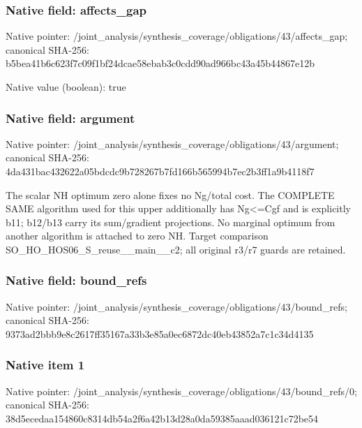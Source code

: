 \documentclass[10pt,a4paper]{article}
\begin{document}
\subsubsection{Native field: affects\_\allowbreak{}gap}
Native pointer: /joint\_\allowbreak{}analysis/synthesis\_\allowbreak{}coverage/obligations/43/affects\_\allowbreak{}gap; canonical SHA-256: b5bea41b6c623f7c09f1bf24dcae58ebab3c0cdd90ad966bc43a45b44867e12b

Native value (boolean): true

\subsubsection{Native field: argument}
Native pointer: /joint\_\allowbreak{}analysis/synthesis\_\allowbreak{}coverage/obligations/43/argument; canonical SHA-256: 4da431bac432622a05bdcdc9b728267b7fd166b565994b7ec2b3ff1a9b4118f7

\begingroup\raggedright\sloppy The scalar NH optimum zero alone fixes no Ng/\allowbreak{}total cost. The COMPLETE SAME algorithm used for this upper additionally has Ng<=\allowbreak{}Cgf and is explicitly b11;\allowbreak{} b12/\allowbreak{}b13 carry its sum/\allowbreak{}gradient projections. No marginal optimum from another algorithm is attached to zero NH. Target comparison SO\_\allowbreak{}HO\_\allowbreak{}HOS06\_\allowbreak{}S\_\allowbreak{}reuse\_\allowbreak{}\_\allowbreak{}main\_\allowbreak{}\_\allowbreak{}c2;\allowbreak{} all original r3/\allowbreak{}r7 guards are retained.\par\endgroup

\subsubsection{Native field: bound\_\allowbreak{}refs}
Native pointer: /joint\_\allowbreak{}analysis/synthesis\_\allowbreak{}coverage/obligations/43/bound\_\allowbreak{}refs; canonical SHA-256: 9373ad2bbb9e8c2617ff35167a33b3e85a0ec6872dc40eb43852a7c1c34d4135

\subsubsection{Native item 1}
Native pointer: /joint\_\allowbreak{}analysis/synthesis\_\allowbreak{}coverage/obligations/43/bound\_\allowbreak{}refs/0; canonical SHA-256: 38d5ecedaa154860c8314db54a2f6a42b13d28a0da59385aaad036121c72be54
\end{document}
